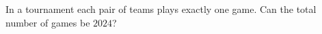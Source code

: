 In a tournament each pair of teams plays exactly one game. Can the total number of games be $2024$?

